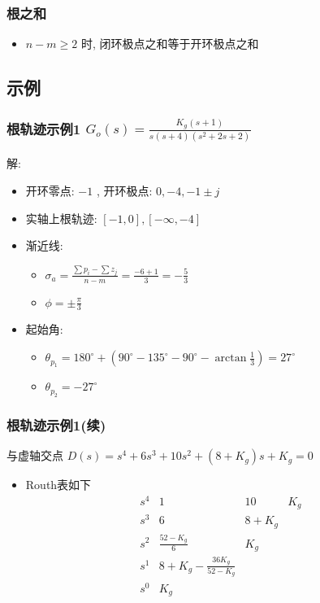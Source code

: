 \documentclass{article}
\begin{document}
\begin{frame}
\frametitle{根之和}
\label{sec-2-1-13}

\begin{itemize}
\item <2-> $n-m\geq 2$ 时, 闭环极点之和等于开环极点之和
\end{itemize}
\end{frame}
\subsection{示例}
\label{sec-2-2}
\begin{frame}
\frametitle{根轨迹示例1 $G_o(s) = \frac{K_g(s+1)}{s(s+4)(s^2+2s+2)}$}
\label{sec-2-2-1}


解:
\begin{itemize}
\item <2->开环零点: $-1$ , 开环极点: $0,-4,-1\pm j$
\item <3->实轴上根轨迹:  $[-1,0],[-\infty,-4]$
\item <4->渐近线:
\begin{itemize}
\item $\sigma_a=\frac{\sum p_i-\sum z_j}{n-m}=\frac{-6+1}{3}=-\frac{5}{3}$
\item $\phi=\pm\frac{\pi}{3}$
\end{itemize}
\item <5->起始角:
\begin{itemize}
\item $\theta_{p_1}=180^{\circ}+(90^{\circ}-135^{\circ}-90^{\circ}-\arctan\frac{1}{3})=27^{\circ}$
\item $\theta_{p_2}=-27^{\circ}$
\end{itemize}
\end{itemize}
\end{frame}
\begin{frame}
\frametitle{根轨迹示例1(续)}
\label{sec-2-2-2}

  与虚轴交点  $D(s)=s^4+6s^3+10s^2+(8+K_g)s+K_g =0$ 
\begin{itemize}

\item Routh表如下\\
\label{sec-2-2-2-1}%
\[\begin{matrix}
       	s^4 & 1 & 10 & K_g \\
       	s^3 & 6 & 8+K_g \\
       	s^2 & \frac{52-K_g}{6} & K_g \\
       	s^1 & 8+K_g-\frac{36K_g}{52-K_g} \\
       	s^0 & K_g
       	\end{matrix}\]

\end{itemize} %
\end{frame}
\end{document}
